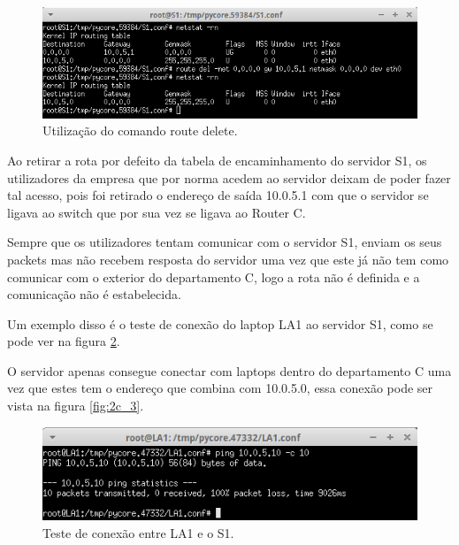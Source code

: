 \documentclass{llncs}
\begin{document}
\begin{figure}[H]
\begin{center}
\includegraphics[scale=0.60]{2c.png} 
\end{center}
\caption{\label{fig:2c} Utilização do comando route delete.}
\end{figure}

Ao retirar a rota por defeito da tabela de encaminhamento do servidor S1, os utilizadores da empresa que por norma acedem ao servidor deixam de poder fazer tal acesso, pois foi retirado o endereço de saída 10.0.5.1 com que o servidor se ligava ao switch que por sua vez se ligava ao Router C. 

Sempre que os utilizadores tentam comunicar com o servidor S1, enviam os seus packets mas não recebem resposta do servidor uma vez que este já não tem como comunicar com o exterior do departamento C, logo a rota não é definida e a comunicação não é estabelecida.

Um exemplo disso é o teste de conexão do laptop LA1 ao servidor S1, como se pode ver na figura \ref{fig:2c_2}.

O servidor apenas consegue conectar com laptops dentro do departamento C uma vez que estes tem o endereço que combina com 10.0.5.0, essa conexão pode ser vista na figura \ref{fig:2c_3}.

\begin{figure}[H]
\begin{center}
\includegraphics[scale=0.60]{2c_2.png} 
\end{center}
\caption{\label{fig:2c_2} Teste de conexão entre LA1 e o S1.}
\end{figure}
\end{document}
